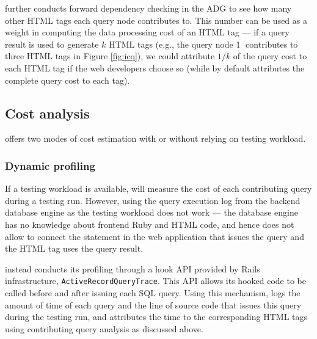 \Tool further conducts forward dependency checking in the ADG to see how many other
HTML tags each query node contributes to. This number can be used
as a weight in computing the data processing cost of an HTML tag
--- if a query result is used to generate $k$ HTML tags
(e.g., the query node {\large \textcircled{\small 1}} contributes to three HTML tags in Figure \ref{fig:icq}), 
we could attribute $1/k$ of the query cost to each HTML tag if the web developers
choose so (while by default \Tool attributes the complete query cost to each tag).

\subsection{Cost analysis}


\Tool offers two modes of cost estimation with or without relying on testing workload.

\subsubsection{Dynamic profiling}
\label{sec:profile_dynamic}

If a testing workload is available, \Tool
will measure the cost of each contributing query during a 
testing run. However, using 
the query execution log from the backend database engine as the testing workload does not work ---
the database engine has no knowledge about frontend Ruby and HTML code, 
and hence does not allow \Tool to connect the statement in the web application that issues the query and the HTML tag uses the query result.

\Tool instead conducts its profiling through a hook API provided by Rails infrastructure, 
{\tt ActiveRecordQueryTrace}. This API allows its hooked code to be called before and after
issuing each SQL query. 
Using this mechanism, \Tool logs the amount of time of each query and the line of source code that
issues this query during the testing run, and attributes the time to the corresponding HTML tags using 
contributing query analysis as discussed above.


